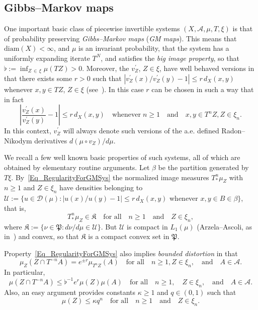 \documentclass[10pt]{amsart}
\theoremstyle{definition}\newtheorem{defi}[theo]{Definition}\newtheorem{rema}[theo]{Remark}\newtheorem{exam}[theo]{Example}\newtheorem{exem}[theo]{Example}\newtheorem{nota}[theo]{Notation}
\newcommand{\clA}{\mathcal{A}}
\newcommand{\clD}{\mathcal{D}}
\newcommand{\clU}{\mathcal{U}}
\newcommand{\diam}{\mathrm{diam}}
\newcommand{\frkK}{\mathfrak{K}}
\newcommand{\frkP}{\mathfrak{P}}
\begin{document}
\subsection{Gibbs--Markov maps}
One important basic class of piecewise invertible systems $(X,\clA,\mu,T,\xi)$ is that of probability preserving \emph{Gibbs--Markov maps} (\emph{GM maps}). This means that $\diam (X)<\infty$, and $\mu$ is an invariant probability, that the system has a uniformly expanding iterate $T^{N}$, and satisfies the \emph{big image property}, so that $\flat:=\inf_{Z\,\in\,\xi}\mu(TZ)>0$. Moreover, the $v_{Z}^{\prime}$, $Z\in\xi$, have well behaved versions in that there exists some $r>0$ such that $\left\vert v_{Z}^{\prime}(x)/v_{Z}^{\prime }(y)-1\right\vert \leq r\,d_{X}(x,y)$ whenever $x,y\in TZ$, $Z\in\xi$ (see~\cite{AD}). In this case $r$ can be chosen in such a way that in fact
\begin{equation}\label{Eq_RegularityForGMSys}
\left\vert \frac{v_{Z}^{\prime}(x)}{v_{Z}^{\prime}(y)}-1\right\vert \leq r\,d_{X}(x,y) \quad\text{whenever}\;n\geq1\quad\text{and}\quad x,y\in T^{n}Z,Z\in
\xi_{n}. 
\end{equation}
In this context, $v_{Z}^{\prime}$ will always denote such versions of the a.e. defined Radon--Nikodym derivatives $d(\mu\circ v_{Z})/d\mu$.


We recall a few well known basic properties of such systems, all of which are obtained by elementary routine arguments. Let $\beta$ be the partition generated by $T\xi$. By~\eqref{Eq_RegularityForGMSys} the normalized image measures $T_{\ast}^{n}\mu_{Z}$ with $n\geq1$ and $Z\in\xi_{n}$ have densities belonging to $\clU:=\{u\in\clD(\mu):\vert u(x)/u(y)-1\vert \leq r\,d_{X}(x,y)$ whenever $x,y\in B\in\beta\}$, that is,
\begin{equation}\label{Eq_GMgoodK}
T_{\ast}^{n}\mu_{Z}\in\frkK\quad\text{for all}\quad n\geq1\quad\text{and}\quad Z\in\xi_{n},
\end{equation}
where $\frkK:=\{\nu\in\frkP:d\nu/d\mu\in\clU\}$. But $\clU$ is compact in $L_{1}(\mu)$ (Arzela--Ascoli, as in~\cite[\S~4.7]{A0}) and convex, so that $\frkK$ is a compact convex set in $\frkP$.

Property~\eqref{Eq_RegularityForGMSys} also implies \emph{bounded distortion} in that
\begin{equation}\label{Eq_AbstractAdlerInfty}
\mu_{Z}\left(Z\cap T^{-n}A\right)=e^{\pm r}\mu_{T^{n}Z}(A)\quad \text{for all}\quad n\geq1, Z\in\xi_{n}, \quad\text{and}\quad A\in\clA.
\end{equation}
In particular,
\begin{equation}\label{Eq_UpperDistortBound}
\mu\left(Z\cap T^{-n}A\right)\leq\flat^{-1}e^{r}\mu(Z)\mu(A) \quad\text{for all}\quad n\geq1,\quad Z\in\xi_{n},\quad\text{and}\quad A\in\clA.
\end{equation}
Also, an easy argument provides constants $\kappa\geq1$ and $q\in(0,1)$ such that
\begin{equation}\label{Eq_GMMapsContractionOfCylMeasure}
\mu(Z)\leq\kappa q^{n}\quad\text{for all}\quad n\geq1\quad\text{and}\quad Z\in\xi _{n}. 
\end{equation}
\end{document}
